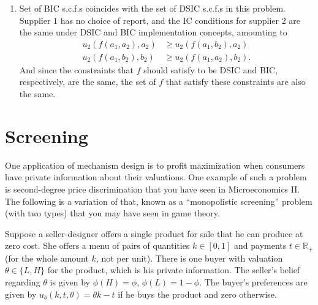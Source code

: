\documentclass[a4paper]{article}
\begin{document}
\begin{enumerate}
	\item Set of BIC s.c.f.s coincides with the set of DSIC s.c.f.s in this problem. Supplier $1$ has no choice of report, and the IC conditions for supplier $2$ are the same under DSIC and BIC implementation concepts, amounting to 
	\begin{align*}
		u_2\left( f(a_1, a_2), a_2 \right) &\geq u_2\left( f(a_1, b_2), a_2 \right)
		\\
		u_2\left( f(a_1, b_2), b_2 \right) &\geq u_2\left( f(a_1, a_2), b_2 \right).
	\end{align*}
	And since the constraints that $f$ should satisfy to be DSIC and BIC, respectively, are the same, the set of $f$ that satisfy these constraints are also the same.
\end{enumerate}
\fi 



\section{Screening}

One application of mechanism design is to profit maximization when consumers have private information about their valuations. One example of such a problem is second-degree price discrimination that you have seen in Microeconomics II. The following is a variation of that, known as a ``monopolistic screening'' problem (with two types) that you may have seen in game theory.

Suppose a seller-designer offers a single product for sale that he can produce at zero cost. She offers a menu of pairs of quantities $k \in [0,1]$ and payments $t \in \mathbb{R}_+$ (for the whole amount $k$, not per unit). There is one buyer with valuation $\theta \in \{ L,H \}$ for the product, which is his private information. The seller's belief regarding $\theta$ is given by $\phi(H) = \phi$, $\phi(L)=1-\phi$. The buyer's preferences are given by $u_b(k,t,\theta) = \theta k - t$ if he buys the product and zero otherwise.
\end{document}
